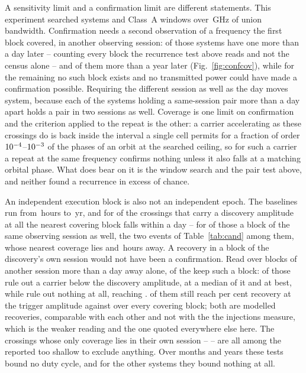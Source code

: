 A sensitivity limit and a confirmation limit are different statements. This
experiment searched \RcSearchSys{} systems and \RcSearchWin{} Class~A windows
over \CvUnionA\,GHz of union bandwidth. Confirmation needs a second
observation of a frequency the first block covered, in another observing
session: \ZcConfSysDay{} of those systems have one more than a day later --
counting every block the recurrence test above reads and not the census alone
-- and \ZcConfSysYr{} of them more than a year later
(Fig.~\ref{fig:confcov}), while for the remaining \ZcNoRepSys{} no such block
exists and no transmitted power could have made a confirmation possible.
Requiring the different session as well as the day moves \QfNSysMovedWord{}
system, because each of the \QfNSysPairDropWord{} systems holding a
same-session pair more than a day apart holds a pair in two sessions as
well. Coverage is one limit on confirmation and
the criterion applied to the repeat is the other: a carrier accelerating as
these crossings do is back inside the interval a single cell permits for a
fraction of order $10^{-4}$--$10^{-3}$ of the phases of
an orbit at the searched ceiling, so for such a carrier a repeat at the same
frequency confirms nothing unless it also falls at a matching orbital
phase. What does bear on it is the window search and the pair test above, and
neither found a recurrence in excess of chance.

An independent execution block is also not an independent epoch. The baselines
run from \RcSepMinH\,hours to \RcSepMaxYr\,yr, and for \RcNSepSameDay{} of the
\RcNExclPoss{} crossings that carry a discovery amplitude at all the nearest
covering block falls within a day -- for \QcNHazard{} of those a block of the
same observing session as well, the two events of Table~\ref{tab:cand} among
them, whose nearest coverage lies \QcEvSepOneH{} and \QcEvSepTwoH\,hours
away. A recovery in a block of the discovery's own session would not have been
a confirmation. Read over blocks of another session more than a day away
alone, \SpNSep{} of the \RcNExcl{} keep such a block: \SpNExcl{} of those rule
out a carrier below the discovery amplitude, at a median \SpFracMed{} of it
and \SpFracMin{} at best, while \SpNVac{} rule out nothing at all, reaching
\SpFracMax. \SpNPower{} of them still reach \RcPowerLevel{} per cent recovery
at the trigger amplitude against \RqNPowerHi{} over every covering block;
both are modelled recoveries, comparable with each other and not with the
\HjNPowerHi{} the injections measure, which is the weaker reading and the one
quoted everywhere else here. The \QfNExclSameOnlyWord{} crossings
whose only coverage lies in their own session -- \SpNoSepList{} -- are all
among the \HjNPowerLo{} reported too shallow to exclude anything. Over months
and years these tests bound no duty cycle, and for the other \ZcNoRepSys{}
systems they bound nothing at all.
